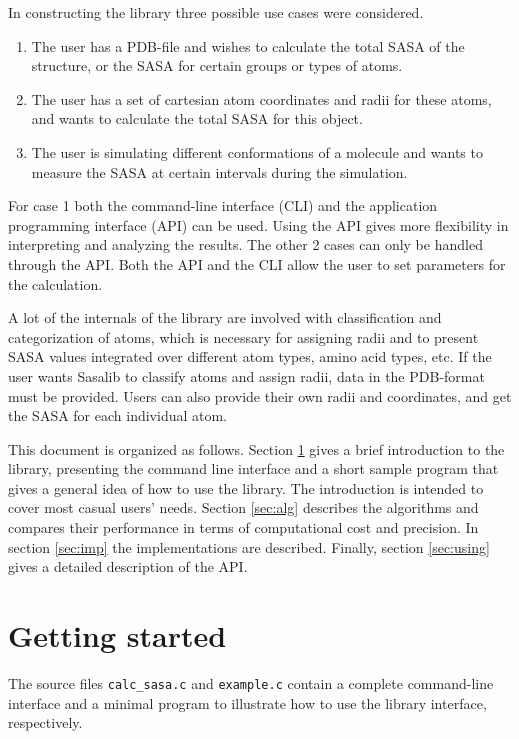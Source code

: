 \documentclass[a4paper,11pt]{article}
\begin{document}
In constructing the library three possible use cases were considered. 
\begin{enumerate}
\item The user has a PDB-file and wishes to calculate the total SASA of
  the structure, or the SASA for certain groups or types of atoms.
\item The user has a set of cartesian atom coordinates and radii for
  these atoms, and wants to calculate the total SASA for this object.
\item The user is simulating different conformations of a molecule and
  wants to measure the SASA at certain intervals during the simulation.
\end{enumerate}
For case 1 both the command-line interface (CLI) and the application
programming interface (API) can be used. Using the API gives more
flexibility in interpreting and analyzing the results. The other 2
cases can only be handled through the API. Both the API and the CLI
allow the user to set parameters for the calculation. 

A lot of the internals of the library are involved with classification
and categorization of atoms, which is necessary for assigning radii
and to present SASA values integrated over different atom types, amino
acid types, etc. If the user wants Sasalib to classify atoms and
assign radii, data in the PDB-format must be provided. Users can also
provide their own radii and coordinates, and get the SASA for each
individual atom.

This document is organized as follows. Section \ref{sec:howto_short}
gives a brief introduction to the library, presenting the command line
interface and a short sample program that gives a general idea of how
to use the library. The introduction is intended to cover most casual
users' needs. Section \ref{sec:alg} describes the algorithms and
compares their performance in terms of computational cost and
precision. In section \ref{sec:imp} the implementations are
described. Finally, section \ref{sec:using} gives a detailed
description of the API.

\section{Getting started}\label{sec:howto_short}

The source files \texttt{calc\_sasa.c} and \texttt{example.c} contain
a complete command-line interface and a minimal program to illustrate
how to use the library interface, respectively. 
\end{document}
